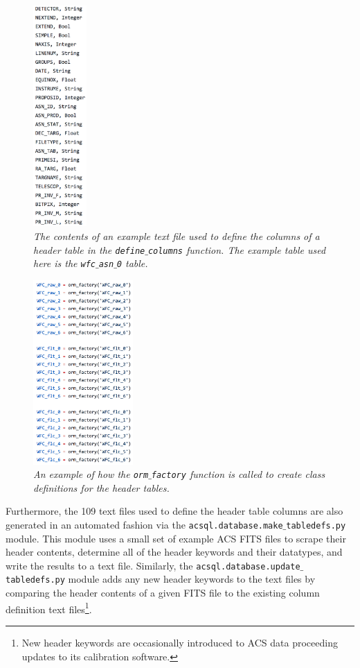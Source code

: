 \documentclass[10pt,journal,compsoc]{IEEEtran}
\begin{document}
\begin{figure}[!h]
\centering
\includegraphics[width=0.8in]{./figures/table_definition.png}
\caption{\textit{The contents of an example text file used to define the columns of a header table in the \texttt{define$\_$columns} function. The example table used here is
the \texttt{wfc$\_$asn$\_$0} table.}}
\label{fig17}
\end{figure}

\begin{figure}[!h]
\centering
\includegraphics[width=1.5in]{./figures/orm_factory_calls.png}
\caption{\textit{An example of how the \texttt{orm$\_$factory} function is called to create class definitions for the header tables.}}
\label{fig18}
\end{figure}

Furthermore, the 109 text files used to define the header table columns are also generated in an automated fashion via the \texttt{acsql.database.make$\_$tabledefs.py} module.  This
module uses a small set of example ACS FITS files to scrape their header contents, determine all of the header keywords and their datatypes, and write the results to a text file.
Similarly, the \texttt{acsql.database.update$\_$tabledefs.py} module adds any new header keywords to the text files by comparing the header contents of a given FITS file to
the existing column definition text files\footnote{New header keywords are occasionally introduced to ACS data proceeding updates to its calibration software.}.
\end{document}
